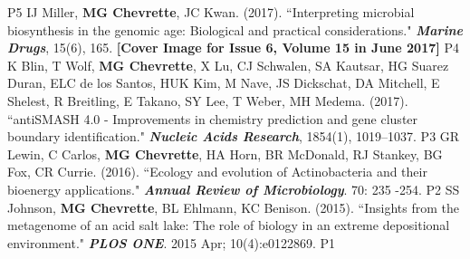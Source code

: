 \begin{cvpubs}
    {P5} %
  \cvpub
    {IJ Miller, \textbf{MG Chevrette}, JC Kwan. (2017). ``Interpreting microbial biosynthesis in the genomic age: Biological and practical considerations." \textit{\textbf{Marine Drugs}}, 15(6), 165. \textbf{\textit{}} 
	\linebreak \textbf{[Cover Image for Issue 6, Volume 15 in June 2017]}    
    } %
    {P4} %
  \cvpub
    {K Blin, T Wolf, \textbf{MG Chevrette}, X Lu, CJ Schwalen, SA Kautsar, HG Suarez Duran, ELC de los Santos, HUK Kim, M Nave, JS Dickschat, DA Mitchell, E Shelest, R Breitling, E Takano, SY Lee, T Weber, MH Medema. (2017). ``antiSMASH 4.0 - Improvements in chemistry prediction and gene cluster boundary identification." \textit{\textbf{Nucleic Acids Research}}, 1854(1), 1019–1037. \textbf{\textit{}} }  %
    {P3} %
  \cvpub
    {GR Lewin, C Carlos, \textbf{MG Chevrette}, HA Horn, BR McDonald, RJ Stankey, BG Fox, CR Currie. (2016). ``Ecology and evolution of Actinobacteria and their bioenergy applications." \textit{\textbf{Annual Review of Microbiology}}. 70: 235 -254. \textbf{\textit{}} } %
    {P2} %
  \cvpub
    {SS Johnson, \textbf{MG Chevrette}, BL Ehlmann, KC Benison. (2015). ``Insights from the metagenome of an acid salt lake: The role of biology in an extreme depositional environment."  \textit{\textbf{PLOS ONE}}. 2015 Apr; 10(4):e0122869. \textbf{\textit{}} } %
    {P1} %
\end{cvpubs}

